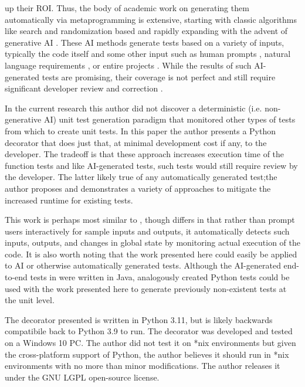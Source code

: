 up their ROI. Thus, the body of academic work on generating them automatically 
via metaprogramming is extensive, starting with classic algorithms like search 
and randomization based \cite{Luk22Pynguin0170} and rapidly expanding 
with the advent of generative AI 
\cite{bhatia2023unit,takerngsaksiri2024tdd,wang2024software, kahur2023java}.
%
These AI methods generate tests based on a variety of inputs, typically the code
itself and some other input such as human prompts 
\cite{lahiri2023interactivecodegenerationtestdriven},
natural language requirements \cite{wang2024software}, or entire projects
\cite{rao2023cat}.  While the results of such AI-generated tests are promising,
their coverage is not perfect \cite{kahur2023java} and still require significant
developer review and correction \cite{sundqvist2024ai}.

In the current research this author did not discover a deterministic (i.e.
non-generative AI) unit test generation paradigm that monitored other types of
tests from which to create unit tests.  In this paper the author presents
a Python decorator that does just that, at minimal development cost if any, to the developer.
The tradeoff is that these approach increases execution time of the function 
tests and like AI-generated tests, such tests would still require review by the developer.
The latter likely true of any automatically generated test;the author proposes and 
demonstrates a variety of approaches to mitigate the increased runtime for
existing tests.

This work is perhaps most similar to 
\cite{lahiri2023interactivecodegenerationtestdriven}, though
differs in that rather than prompt users interactively for sample inputs and
outputs, it automatically detects such inputs, outputs, and changes in global
state by monitoring actual execution of the code.  It is also worth noting 
that the work presented here could easily be applied to AI or otherwise 
automatically generated tests.  Although the AI-generated end-to-end tests 
in \cite{leotta2024ai} were written in Java, analogously created Python tests could
be used with the work presented here to generate previously non-existent 
tests at the unit level.

The decorator presented is written in Python 3.11, but is likely backwards
compatibile back to Python 3.9 to run.
%
The decorator was developed and tested on a Windows 10 PC.  The author 
did not test it on *nix environments but given the cross-platform support of
Python, the author believes it should run in *nix environments with no more than
minor modifications.
%
The author releases it under the GNU LGPL open-source license.
